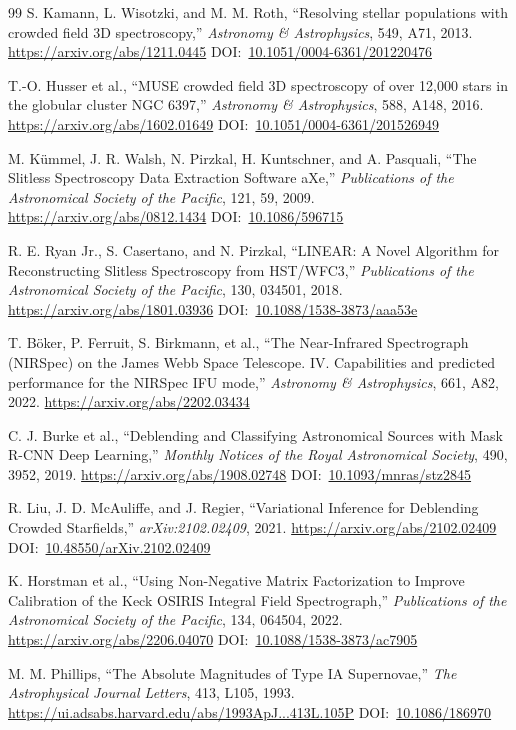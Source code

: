 \documentclass[10pt,onecolumn]{article}
\newcommand{\doi}[1]{DOI:~\href{https://doi.org/#1}{#1}}
\begin{document}
\begin{thebibliography}{99}
S. Kamann, L. Wisotzki, and M. M. Roth,
``Resolving stellar populations with crowded field 3D spectroscopy,''
\emph{Astronomy \& Astrophysics}, 549, A71, 2013.
\url{https://arxiv.org/abs/1211.0445}
\doi{10.1051/0004-6361/201220476}

T.-O. Husser et al.,
``MUSE crowded field 3D spectroscopy of over 12,000 stars in the globular cluster NGC 6397,''
\emph{Astronomy \& Astrophysics}, 588, A148, 2016.
\url{https://arxiv.org/abs/1602.01649}
\doi{10.1051/0004-6361/201526949}

M. K{\"u}mmel, J. R. Walsh, N. Pirzkal, H. Kuntschner, and A. Pasquali,
``The Slitless Spectroscopy Data Extraction Software aXe,''
\emph{Publications of the Astronomical Society of the Pacific}, 121, 59, 2009.
\url{https://arxiv.org/abs/0812.1434}
\doi{10.1086/596715}

R. E. Ryan Jr., S. Casertano, and N. Pirzkal,
``LINEAR: A Novel Algorithm for Reconstructing Slitless Spectroscopy from HST/WFC3,''
\emph{Publications of the Astronomical Society of the Pacific}, 130, 034501, 2018.
\url{https://arxiv.org/abs/1801.03936}
\doi{10.1088/1538-3873/aaa53e}

T. B\"oker, P. Ferruit, S. Birkmann, et al.,
``The Near-Infrared Spectrograph (NIRSpec) on the James Webb Space Telescope. IV. Capabilities and predicted performance for the NIRSpec IFU mode,''
\emph{Astronomy \& Astrophysics}, 661, A82, 2022.
\url{https://arxiv.org/abs/2202.03434}

C. J. Burke et al.,
``Deblending and Classifying Astronomical Sources with Mask R-CNN Deep Learning,''
\emph{Monthly Notices of the Royal Astronomical Society}, 490, 3952, 2019.
\url{https://arxiv.org/abs/1908.02748}
\doi{10.1093/mnras/stz2845}

R. Liu, J. D. McAuliffe, and J. Regier,
``Variational Inference for Deblending Crowded Starfields,''
\emph{arXiv:2102.02409}, 2021.
\url{https://arxiv.org/abs/2102.02409}
\doi{10.48550/arXiv.2102.02409}

K. Horstman et al.,
``Using Non-Negative Matrix Factorization to Improve Calibration of the Keck OSIRIS Integral Field Spectrograph,''
\emph{Publications of the Astronomical Society of the Pacific}, 134, 064504, 2022.
\url{https://arxiv.org/abs/2206.04070}
\doi{10.1088/1538-3873/ac7905}

M. M. Phillips,
``The Absolute Magnitudes of Type IA Supernovae,''
\emph{The Astrophysical Journal Letters}, 413, L105, 1993.
\url{https://ui.adsabs.harvard.edu/abs/1993ApJ...413L.105P}
\doi{10.1086/186970}


\end{thebibliography}
\end{document}

